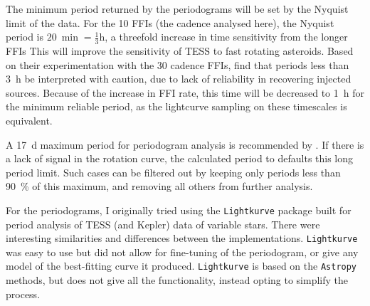 \documentclass{UCreport}
\begin{document}
The minimum period returned by the periodograms will be set by the Nyquist limit of the data.
For the \qty{10}{\min} FFIs (the cadence analysed here), the Nyquist period is $\qty{20}{\min}=\frac13\unit{\hour}$, a threefold increase in time sensitivity from the longer FFIs
This will improve the sensitivity of TESS to fast rotating asteroids.
Based on their experimentation with the \qty{30}{\min} cadence FFIs, \citet{McNeill2023} find that periods less than \qty{3}{\hour} be interpreted with caution, due to lack of reliability in recovering injected sources.
Because of the increase in FFI rate, this time will be decreased to \qty{1}{\hour} for the minimum reliable period, as the lightcurve sampling on these timescales is equivalent.

A \qty{17}{\day} maximum period for periodogram analysis is recommended by \citeauthor{McNeill2023}.
If there is a lack of signal in the rotation curve, the calculated period to defaults this long period limit.
Such cases can be filtered out by keeping only periods less than \qty{90}{\percent} of this maximum, and removing all others from further analysis.

For the periodograms, I originally tried using the \texttt{Lightkurve} \citep{Lightkurve2018} package built for period analysis of TESS (and Kepler) data of variable stars.
There were interesting similarities and differences between the implementations.
\texttt{Lightkurve} was easy to use but did not allow for fine-tuning of the periodogram, or give any model of the best-fitting curve it produced.
\texttt{Lightkurve} is based on the \texttt{Astropy} methods, but does not give all the functionality, instead opting to simplify the process.
\end{document}
